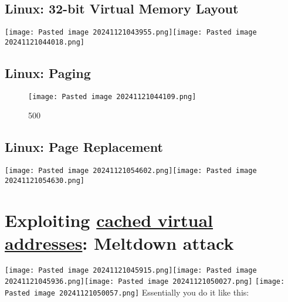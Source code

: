 \subsection*{Linux: 32-bit Virtual Memory Layout}

\texttt{[image: Pasted image 20241121043955.png]}\texttt{[image: Pasted image 20241121044018.png]}

\subsection*{Linux: Paging}

\begin{figure}
\centering
\texttt{[image: Pasted image 20241121044109.png]}
\caption{500}
\end{figure}

\subsection*{Linux: Page Replacement}

\texttt{[image: Pasted image 20241121054602.png]}\texttt{[image: Pasted image 20241121054630.png]}

\section*{\texorpdfstring{Exploiting \ul{cached virtual addresses}:
Meltdown attack}{Exploiting cached virtual addresses: Meltdown attack}}

\texttt{[image: Pasted image 20241121045915.png]}\texttt{[image: Pasted image 20241121045936.png]}\texttt{[image: Pasted image 20241121050027.png]}
\texttt{[image: Pasted image 20241121050057.png]} Essentially you do it
like this:

